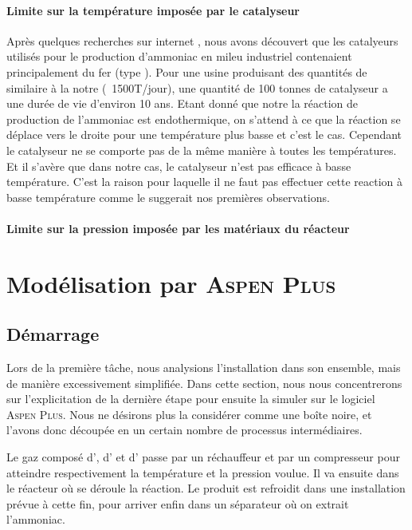 \paragraph{Limite sur la température imposée par le catalyseur}

Après quelques recherches sur internet \cite{catalyseur}, nous avons découvert que les catalyeurs utilisés
pour le production d'ammoniac en mileu industriel contenaient principalement du fer (type ). 
Pour une usine produisant des quantités de  similaire à la notre (~1500T/jour), une quantité de 100 tonnes
de catalyseur a une durée de vie d'environ 10 ans. Etant donné que notre la réaction de production de l'ammoniac est
endothermique, on s'attend à ce que la réaction se déplace vers le droite pour une température plus basse et c'est le cas.
Cependant le catalyseur ne se comporte pas de la m\^eme manière à toutes les températures. Et il s'avère que dans notre
cas, le catalyseur n'est pas efficace à basse température. C'est la raison pour laquelle il ne faut pas effectuer
cette reaction à basse température comme le suggerait nos premières observations.

\paragraph{Limite sur la pression imposée par les matériaux du réacteur}

\section{Modélisation par \textsc{Aspen Plus}}
\subsection{Démarrage}

Lors de la première tâche, nous analysions l'installation dans son ensemble, 
mais de manière excessivement simplifiée. 
Dans cette section, nous nous concentrerons sur l'explicitation de la dernière étape 
pour ensuite la simuler sur le logiciel \textsc{Aspen Plus}. 
Nous ne désirons plus la considérer comme une boîte noire, et l'avons donc découpée 
en un certain nombre de processus intermédiaires. 

Le gaz composé d', d' et d' passe par un réchauffeur 
et par un compresseur pour atteindre respectivement la température et la pression voulue. 
Il va ensuite dans le réacteur où se déroule la réaction.
Le produit est refroidit dans une installation prévue à cette fin, 
pour arriver enfin dans un séparateur où on extrait l'ammoniac.

